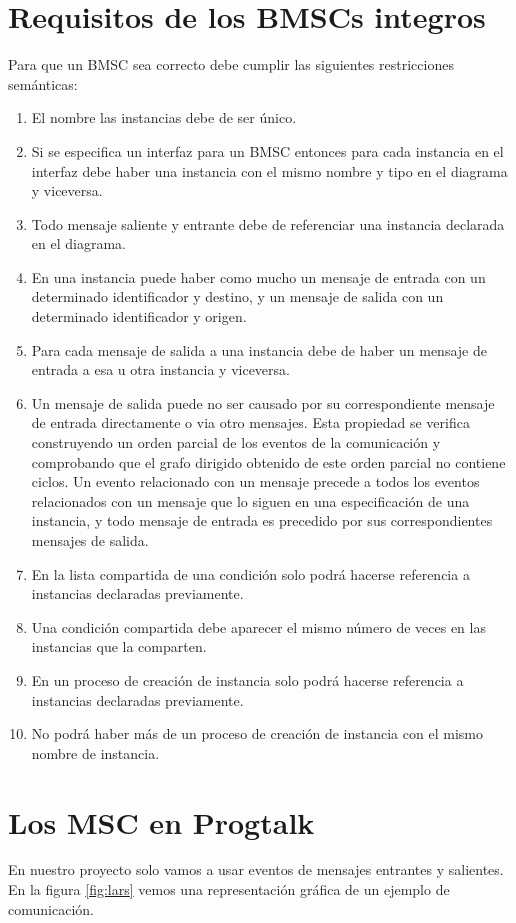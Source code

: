 \section{Requisitos de los BMSCs integros}
Para que un BMSC sea correcto debe cumplir las siguientes
restricciones semánticas:

\begin{enumerate}
\item El nombre las instancias debe de ser único.
\item Si se especifica un interfaz para un BMSC entonces para cada
instancia en el interfaz debe haber una instancia con el mismo 
nombre y tipo en el diagrama y viceversa.
\item Todo mensaje saliente y entrante debe de referenciar una
instancia declarada en el diagrama.
\item En una instancia puede haber como mucho un mensaje de entrada
con un determinado identificador y destino, y un mensaje de salida con
un determinado identificador y origen.
\item Para cada mensaje de salida a una instancia debe de haber un 
mensaje de entrada a esa u otra instancia y viceversa.
\item Un mensaje de salida puede no ser causado por su correspondiente
mensaje de entrada directamente o via otro mensajes.     
Esta propiedad se verifica construyendo un orden parcial de los 
eventos de la comunicación y comprobando que el grafo dirigido 
obtenido de este orden parcial no contiene ciclos. Un evento
relacionado con un mensaje precede a todos los eventos relacionados
con un mensaje que lo siguen en una especificación de una instancia,
y todo mensaje de entrada es precedido por sus correspondientes 
mensajes de salida.
\item En la lista compartida de una condición solo podrá hacerse
referencia a instancias declaradas previamente.
\item Una condición compartida debe aparecer el mismo número de
veces en las instancias que la comparten.
\item En un proceso de creación de instancia solo podrá hacerse
referencia a instancias declaradas previamente.
\item No podrá haber más de un proceso de creación de instancia con
el mismo nombre de instancia.
\end{enumerate}

\section{Los MSC en Progtalk}
En nuestro proyecto solo vamos a usar eventos de mensajes entrantes y
salientes. En la figura \ref{fig:lars}
 vemos una representación
gráfica de un ejemplo de comunicación.

